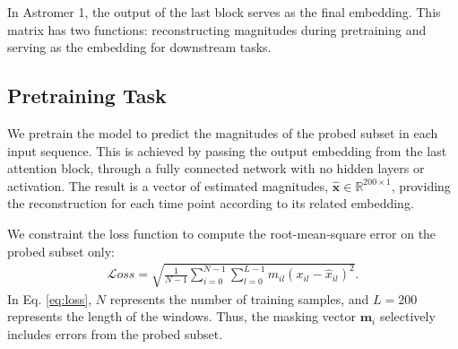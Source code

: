 In Astromer 1, the output of the last block serves as the final embedding. This matrix has two functions: reconstructing magnitudes during pretraining and serving as the embedding for downstream tasks.

\subsection{Pretraining Task}
We pretrain the model to predict the magnitudes of the probed subset in each input sequence. This is achieved by passing %
the output embedding from the last attention block, through a fully connected network with no hidden layers or activation. The result is a vector of estimated magnitudes, $\boldsymbol{\hat{x}} \in \mathbb{R}^{200\times 1}$, providing the reconstruction for each time point according to its related embedding.

We constraint the loss function to compute the root-mean-square error on the probed subset only:
\begin{eqnarray}\label{eq:loss}
    \mathcal{L}oss = \sqrt{\frac{1}{N-1}\sum_{i=0}^{N-1}\sum_{l=0}^{L-1} m_{il}(x_{il} - \hat{x}_{il})^2}.
\end{eqnarray}
In Eq. \ref{eq:loss}, $N$ represents the number of training samples, and $L=200$ represents the length of the windows. Thus, the masking vector $\boldsymbol{m}_{i}$ selectively includes errors from the probed subset.
